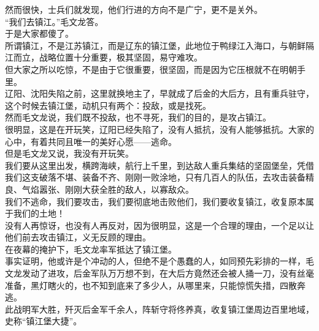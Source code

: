 \begin{multicols}{\theparacolNo}
然而很快，士兵们就发现，他们行进的方向不是广宁，更不是关外。\\

“我们去镇江。”毛文龙答。\\

于是大家都傻了。\\

所谓镇江，不是江苏镇江，而是辽东的镇江堡，此地位于鸭绿江入海口，与朝鲜隔江而立，战略位置十分重要，极其坚固，易守难攻。\\

但大家之所以吃惊，不是由于它很重要，很坚固，而是因为它压根就不在明朝手里。\\

辽阳、沈阳失陷之前，这里就换地主了，早就成了后金的大后方，且有重兵驻守，这个时候去镇江堡，动机只有两个：投敌，或是找死。\\

然而毛文龙说，我们既不投敌，也不寻死，我们的目的，是攻占镇江。\\

很明显，这是在开玩笑，辽阳已经失陷了，没有人抵抗，没有人能够抵抗。大家的心中，有着共同且唯一的美好心愿——逃命。\\

但是毛文龙又说，我没有开玩笑。\\

我们要从这里出发，横跨海峡，航行上千里，到达敌人重兵集结的坚固堡垒，凭借我们这支破落不堪、装备不齐、刚刚一败涂地，只有几百人的队伍，去攻击装备精良、气焰嚣张、刚刚大获全胜的敌人，以寡敌众。\\

我们不逃命，我们要攻击，我们要彻底地击败他们，我们要收复镇江，收复原本属于我们的土地！\\

没有人再惊讶，也没有人再反对，因为很明显，这是一个合理的理由，一个足以让他们前去攻击镇江，义无反顾的理由。\\

在夜幕的掩护下，毛文龙率军抵达了镇江堡。\\

事实证明，他或许是个冲动的人，但绝不是个愚蠢的人，如同预先彩排的一样，毛文龙发动了进攻，后金军队万万想不到，在大后方竟然还会被人捅一刀，没有丝毫准备，黑灯瞎火的，也不知到底来了多少人，从哪里来，只能惊慌失措，四散奔逃。\\

此战明军大胜，歼灭后金军千余人，阵斩守将佟养真，收复镇江堡周边百里地域，史称“镇江堡大捷”。\\


\end{multicols}
